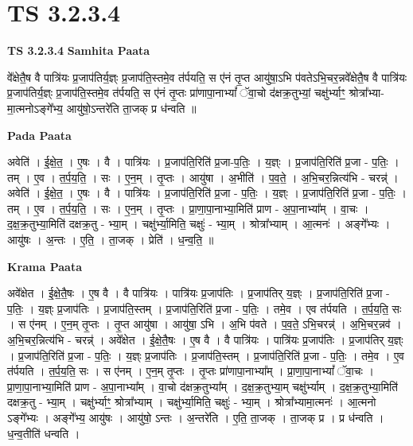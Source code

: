 \documentclass[17pt]{extarticle}
\begin{document}

\section{ TS 3.2.3.4 }

\textbf{TS 3.2.3.4 } \newline
\textbf{Samhita Paata} \newline

वे᳚क्षेतै॒ष वै पात्रि॑यः प्र॒जाप॑तिर्य॒ज्ञ्ः प्र॒जाप॑ति॒स्तमे॒व त॑र्पयति॒ स ए॑नं तृ॒प्त आयु॑षा॒ऽभि प॑वतेऽभि॒चर॒न्नवे᳚क्षेतै॒ष वै पात्रि॑यः प्र॒जाप॑तिर्य॒ज्ञ्ः प्र॒जाप॑ति॒स्तमे॒व त॑र्पयति॒ स ए॑नं तृ॒प्तः प्रा॑णापा॒नाभ्यां᳚ ॅवा॒चो द॑क्षक्र॒तुभ्यां॒ चक्षु॑र्भ्याꣳ॒॒ श्रोत्रा᳚भ्या-मा॒त्मनोऽङ्गे᳚भ्य॒ आयु॑षो॒ऽन्तरे॑ति ता॒जक् प्र ध॑न्वति ॥ \newline

\textbf{Pada Paata} \newline

अवेति॑ । ई॒क्षे॒त॒ । ए॒षः । वै । पात्रि॑यः । प्र॒जाप॑ति॒रिति॑ प्र॒जा-प॒तिः॒ । य॒ज्ञ्ः । प्र॒जाप॑ति॒रिति॑ प्र॒जा - प॒तिः॒ । तम् । ए॒व । त॒र्प॒य॒ति॒ । सः । ए॒न॒म् । तृ॒प्तः । आयु॑षा । अ॒भीति॑ । प॒व॒ते॒ । अ॒भि॒चर॒न्नित्य॑भि - चरन्न्॑ । अवेति॑ । ई॒क्षे॒त॒ । ए॒षः । वै । पात्रि॑यः । प्र॒जाप॑ति॒रिति॑ प्र॒जा - प॒तिः॒ । य॒ज्ञ्ः । प्र॒जाप॑ति॒रिति॑ प्र॒जा - प॒तिः॒ । तम् । ए॒व । त॒र्प॒य॒ति॒ । सः । ए॒न॒म् । तृ॒प्तः । प्रा॒णा॒पा॒नाभ्या॒मिति॑ प्राण - अ॒पा॒नाभ्या᳚म् । वा॒चः । द॒क्ष॒क्र॒तुभ्या॒मिति॑ दक्षक्र॒तु - भ्या॒म् । चक्षु॑र्भ्या॒मिति॒ चक्षुः॑ - भ्या॒म् । श्रोत्रा᳚भ्याम् । आ॒त्मनः॑ । अङ्गे᳚भ्यः । आयु॑षः । अ॒न्तः । ए॒ति॒ । ता॒जक् । प्रेति॑ । ध॒न्व॒ति॒ ॥  \newline


\textbf{Krama Paata} \newline

अवे᳚क्षेत । ई॒क्षे॒तै॒षः । ए॒ष वै । वै पात्रि॑यः । पात्रि॑यः प्र॒जाप॑तिः । प्र॒जाप॑तिर् य॒ज्ञ्ः । प्र॒जाप॑ति॒रिति॑ प्र॒जा - प॒तिः॒ । य॒ज्ञ्ः प्र॒जाप॑तिः । प्र॒जाप॑ति॒स्तम् । प्र॒जाप॑ति॒रिति॑ प्र॒जा - प॒तिः॒ । तमे॒व । एव त॑र्पयति । त॒र्प॒य॒ति॒ सः । स ए॑नम् । ए॒न॒म् तृ॒प्तः । तृ॒प्त आयु॑षा । आयु॑षा॒ ऽभि । अ॒भि प॑वते । प॒व॒ते॒ ऽभि॒चरन्न्॑ । अ॒भि॒चर॒न्नव॑ । अ॒भि॒चर॒न्नित्य॑भि - चरन्न्॑ । अवे᳚क्षेत । ई॒क्षे॒तै॒षः । ए॒ष वै । वै पात्रि॑यः । पात्रि॑यः प्र॒जाप॑तिः । प्र॒जाप॑तिर् य॒ज्ञ्ः । प्र॒जाप॑ति॒रिति॑ प्र॒जा - प॒तिः॒ । य॒ज्ञ्ः प्र॒जाप॑तिः । प्र॒जाप॑ति॒स्तम् । प्र॒जाप॑ति॒रिति॑ प्र॒जा - प॒तिः॒ । तमे॒व । ए॒व त॑र्पयति । त॒र्प॒य॒ति॒ सः । स ए॑नम् । ए॒न॒म् तृ॒प्तः । तृ॒प्तः प्रा॑णापा॒नाभ्या᳚म् । प्रा॒णा॒पा॒नाभ्यां᳚ ॅवा॒चः । प्रा॒णा॒पा॒नाभ्या॒मिति॑ प्राण - अ॒पा॒नाभ्या᳚म् । वा॒चो द॑क्षक्र॒तुभ्या᳚म् । द॒क्ष॒क्र॒तुभ्या॒म् चक्षु॑र्भ्याम् । द॒क्ष॒क्र॒तुभ्या॒मिति॑ दक्षक्र॒तु - भ्या॒म् । चक्षु॑र्भ्याꣳ॒॒ श्रोत्रा᳚भ्याम् । चक्षु॑र्भ्या॒मिति॒ चक्षुः॑ - भ्या॒म् । श्रोत्रा᳚भ्यामा॒त्मनः॑ । आ॒त्मनो ऽङ्गे᳚भ्यः । अङ्गे᳚भ्य॒ आयु॑षः । आयु॑षो॒ ऽन्तः । अ॒न्तरे॑ति । ए॒ति॒ ता॒जक् । ता॒जक् प्र । प्र ध॑न्वति । ध॒न्व॒तीति॑ धन्वति । \newline
\end{document}
